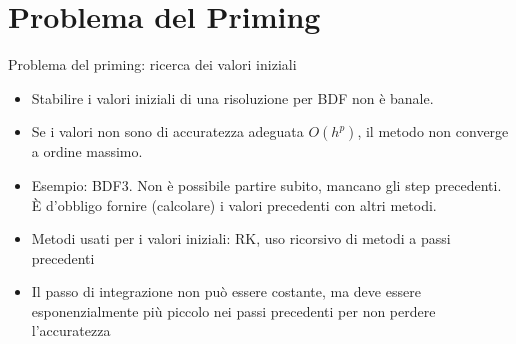 \documentclass[aspectratio=169, 10pt, handout,usenames,dvipsnames]{beamer}
\begin{document}

\section{Problema del Priming}\label{sec:sec7}
    \begin{frame}{Problema del priming: ricerca dei valori iniziali}
        \begin{itemize}
            \item Stabilire i valori iniziali di una risoluzione per BDF non è banale.
            \item Se i valori non sono di accuratezza adeguata $O(h^p)$, il metodo non converge a ordine massimo.
            \item Esempio: BDF3. Non è possibile partire subito, mancano gli step precedenti.\\ 
            È d'obbligo fornire (calcolare) i valori precedenti con altri metodi.
            \item Metodi usati per i valori iniziali: RK, uso ricorsivo di metodi a passi precedenti
            \item Il passo di integrazione non può essere costante, ma deve essere esponenzialmente più piccolo nei passi precedenti per non perdere l'accuratezza
        \end{itemize}   
    \end{frame}
\end{document}
